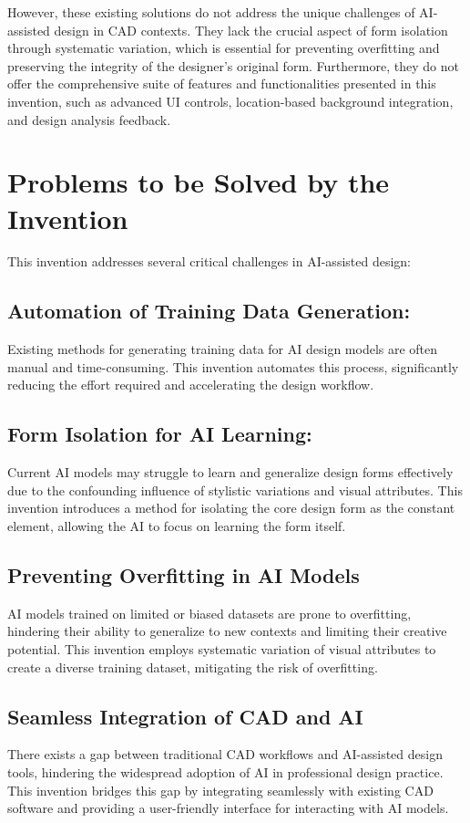 \documentclass{article}
\begin{document}
However, these existing solutions do not address the unique challenges of AI-assisted design in CAD contexts. They lack the crucial aspect of form isolation through systematic variation, which is essential for preventing overfitting and preserving the integrity of the designer's original form. Furthermore, they do not offer the comprehensive suite of features and functionalities presented in this invention, such as advanced UI controls, location-based background integration, and design analysis feedback.

\section{Problems to be Solved by the Invention}

This invention addresses several critical challenges in AI-assisted design:

\subsection{Automation of Training Data Generation:}
Existing methods for generating training data for AI design models are often manual and time-consuming. This invention automates this process, significantly reducing the effort required and accelerating the design workflow.

\subsection{Form Isolation for AI Learning:}
Current AI models may struggle to learn and generalize design forms effectively due to the confounding influence of stylistic variations and visual attributes. This invention introduces a method for isolating the core design form as the constant element, allowing the AI to focus on learning the form itself.

\subsection{Preventing Overfitting in AI Models}
AI models trained on limited or biased datasets are prone to overfitting, hindering their ability to generalize to new contexts and limiting their creative potential. This invention employs systematic variation of visual attributes to create a diverse training dataset, mitigating the risk of overfitting.

\subsection{Seamless Integration of CAD and AI}
There exists a gap between traditional CAD workflows and AI-assisted design tools, hindering the widespread adoption of AI in professional design practice. This invention bridges this gap by integrating seamlessly with existing CAD software and providing a user-friendly interface for interacting with AI models.
\end{document}
